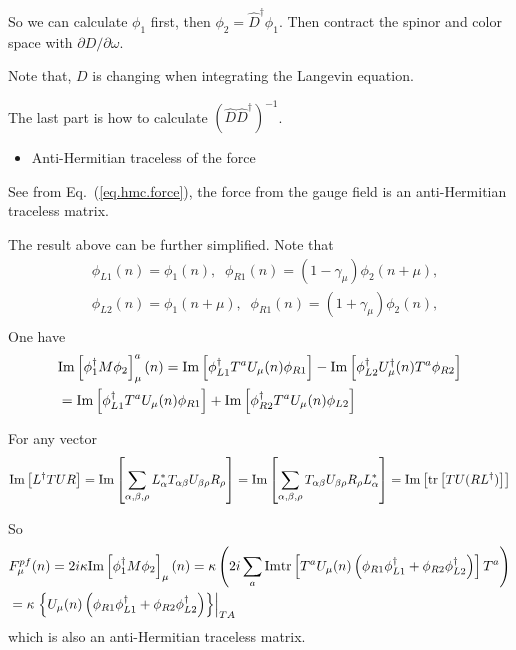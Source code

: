So we can calculate $\phi _1$ first, then $\phi _2 = \hat{D}^{\dagger}\phi _1$. Then contract the spinor and color space with $\partial D / \partial \omega$.

Note that, $D$ is changing when integrating the Langevin equation.

The last part is how to calculate $(\hat{D}\hat{D}^{\dagger})^{-1}$.

\begin{itemize}
  \item Anti-Hermitian traceless of the force
\end{itemize}

See from Eq.~(\ref{eq.hmc.force}), the force from the gauge field is an anti-Hermitian traceless matrix.

The result above can be further simplified. Note that
\begin{equation}
\begin{split}
&\phi_{L1}(n)=\phi _1(n),\;\;\phi _{R1}(n)=(1-\gamma _{\mu})\phi _2(n+\mu),\\
&\phi_{L2}(n)=\phi _1(n+\mu),\;\;\phi _{R1}(n)=(1+\gamma _{\mu})\phi _2(n),\\
\end{split}
\end{equation}
One have
\begin{equation}
\begin{split}
&{\rm Im}\left[\phi _1^{\dagger}M\phi _2\right]_{\mu}^a(n)={\rm Im}\left[\phi _{L1}^{\dagger}T^aU_{\mu}(n)\phi _{R1}\right]-{\rm Im}\left[\phi _{L2}^{\dagger}U_{\mu}^{\dagger}(n)T^a\phi _{R2}\right]\\
&={\rm Im}\left[\phi _{L1}^{\dagger}T^aU_{\mu}(n)\phi _{R1}\right]+{\rm Im}\left[\phi _{R2}^{\dagger}T^aU_{\mu}(n)\phi _{L2}\right]\\
\end{split}
\end{equation}

For any vector
\begin{equation}
\begin{split}
&{\rm Im}\left[L^{\dagger}TUR\right]={\rm Im}\left[\sum _{\alpha,\beta,\rho}L_{\alpha}^*T_{\alpha\beta}U_{\beta\rho}R_{\rho}\right]={\rm Im}\left[\sum _{\alpha,\beta,\rho}T_{\alpha\beta}U_{\beta\rho}R_{\rho}L_{\alpha}^*\right]={\rm Im}\left[{\rm tr}\left[TU(RL^{\dagger})\right]\right]\\
\end{split}
\end{equation}

So
\begin{equation}
\begin{split}
&F^{pf}_{\mu}(n)=2i\kappa{\rm Im}\left[\phi _1^{\dagger}M\phi _2\right]_{\mu}(n)=\kappa \left(2i\sum _a{\rm Im}{\rm tr}\left[T^a U_{\mu}(n)\left(\phi _{R1}\phi _{L1}^{\dagger}+\phi _{R2}\phi _{L2}^{\dagger}\right)\right]T^a\right)\\
&=\kappa \left.\left\{U_{\mu}(n)\left(\phi _{R1}\phi _{L1}^{\dagger}+\phi _{R2}\phi _{L2}^{\dagger}\right)\right\}\right|_{TA}
\end{split}
\end{equation}
which is also an anti-Hermitian traceless matrix.

